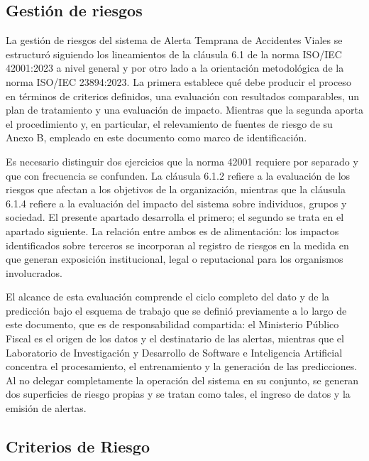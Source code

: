 
\subsection{Gestión de riesgos}\label{gestiuxf3n-de-riesgos}\label{gestion-de-riesgos}

La gestión de riesgos del sistema de Alerta Temprana de Accidentes Viales se estructuró siguiendo los lineamientos de la cláusula 6.1 de la norma ISO/IEC 42001:2023 a nivel general y por otro lado a la orientación metodológica de la norma ISO/IEC 23894:2023. La primera establece qué debe producir el proceso en términos de criterios definidos, una evaluación con resultados comparables, un plan de tratamiento y una evaluación de impacto. Mientras que la segunda aporta el procedimiento y, en particular, el relevamiento de fuentes de riesgo de su Anexo B, empleado en este documento como marco de identificación.

Es necesario distinguir dos ejercicios que la norma 42001 requiere por separado y que con frecuencia se confunden. La cláusula 6.1.2 refiere a la evaluación de los riesgos que afectan a los objetivos de la organización, mientras que la cláusula 6.1.4 refiere a la evaluación del impacto del sistema sobre individuos, grupos y sociedad. El presente apartado desarrolla el primero; el segundo se trata en el apartado siguiente. La relación entre ambos es de alimentación: los impactos identificados sobre terceros se incorporan al registro de riesgos en la medida en que generan exposición institucional, legal o reputacional para los organismos involucrados.

El alcance de esta evaluación comprende el ciclo completo del dato y de la predicción bajo el esquema de trabajo que se definió previamente a lo largo de este documento, que es de responsabilidad compartida: el Ministerio Público Fiscal es el origen de los datos y el destinatario de las alertas, mientras que el Laboratorio de Investigación y Desarrollo de Software e Inteligencia Artificial concentra el procesamiento, el entrenamiento y la generación de las predicciones. Al no delegar completamente la operación del sistema en su conjunto, se generan dos superficies de riesgo propias y se tratan como tales, el ingreso de datos y la emisión de alertas.

\subsection{Criterios de Riesgo}\label{criterios-de-riesgo}

